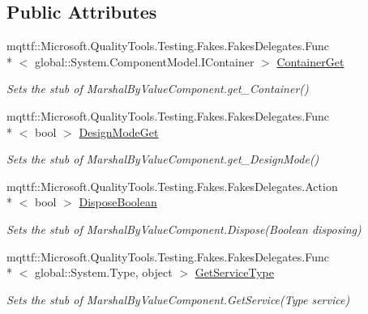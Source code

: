 \subsection*{Public Attributes}
\begin{DoxyCompactItemize}
\item 
mqttf\-::\-Microsoft.\-Quality\-Tools.\-Testing.\-Fakes.\-Fakes\-Delegates.\-Func\\*
$<$ global\-::\-System.\-Component\-Model.\-I\-Container $>$ \hyperlink{class_system_1_1_component_model_1_1_fakes_1_1_stub_marshal_by_value_component_a76f5e2aae558dd5144a9233ed80d687c}{Container\-Get}
\begin{DoxyCompactList}\small\item\em Sets the stub of Marshal\-By\-Value\-Component.\-get\-\_\-\-Container()\end{DoxyCompactList}\item 
mqttf\-::\-Microsoft.\-Quality\-Tools.\-Testing.\-Fakes.\-Fakes\-Delegates.\-Func\\*
$<$ bool $>$ \hyperlink{class_system_1_1_component_model_1_1_fakes_1_1_stub_marshal_by_value_component_a138b4fd142abdac7e10c03e79f79ee0e}{Design\-Mode\-Get}
\begin{DoxyCompactList}\small\item\em Sets the stub of Marshal\-By\-Value\-Component.\-get\-\_\-\-Design\-Mode()\end{DoxyCompactList}\item 
mqttf\-::\-Microsoft.\-Quality\-Tools.\-Testing.\-Fakes.\-Fakes\-Delegates.\-Action\\*
$<$ bool $>$ \hyperlink{class_system_1_1_component_model_1_1_fakes_1_1_stub_marshal_by_value_component_aff6bdffb807eb2cd4d87f693fe9e18a8}{Dispose\-Boolean}
\begin{DoxyCompactList}\small\item\em Sets the stub of Marshal\-By\-Value\-Component.\-Dispose(\-Boolean disposing)\end{DoxyCompactList}\item 
mqttf\-::\-Microsoft.\-Quality\-Tools.\-Testing.\-Fakes.\-Fakes\-Delegates.\-Func\\*
$<$ global\-::\-System.\-Type, object $>$ \hyperlink{class_system_1_1_component_model_1_1_fakes_1_1_stub_marshal_by_value_component_af412621ccd3f383e82648acb564ae17f}{Get\-Service\-Type}
\begin{DoxyCompactList}\small\item\em Sets the stub of Marshal\-By\-Value\-Component.\-Get\-Service(\-Type service)\end{DoxyCompactList}\item 

\end{DoxyCompactItemize}
